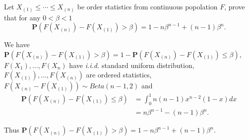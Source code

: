 \begin{problem}
    Let $ X_{(1)}\le\cdots\le X_{(n)}$ be order statistics from continuous popolation  $F$, prove that for any $0<\beta<1$
    \begin{equation*}
        \mathbf{P}(F(X_{(n)})-F(X_{(1)})>\beta)=1-n\beta^{n-1}+(n-1)\beta^n.
    \end{equation*}
\end{problem}
\begin{solution}
    
    



    We have $ \mathbf{P} (F(X_{(n)})-F(X_{(1)})>\beta) = 1 -  \mathbf{P} (F(X_{(n)})-F(X_{(1)}) \le \beta) $, $F(X_1), \dots, F(X_n)$ have \emph{i.i.d.} standard uniform distribution, $F(X_{(1)}), \dots, F(X_{(n)})$ are ordered statistics, $ F(X_{(n)} - F(X_{(1)})) \sim Beta(n-1, 2)$ and 
    \begin{equation*}
        \begin{split}
            \mathbf{P} (F(X_{(n)})-F(X_{(1)}) \le \beta) & = \int_0^1 n(n-1) x^{n-2} (1-x) dx \\
            & = n\beta^{n-1} - (n-1)\beta^n.
        \end{split}
    \end{equation*}

    Thus $ \mathbf{P}(F(X_{(n)})-F(X_{(1)})>\beta)=1-n\beta^{n-1}+(n-1)\beta^n.$
\end{solution}




